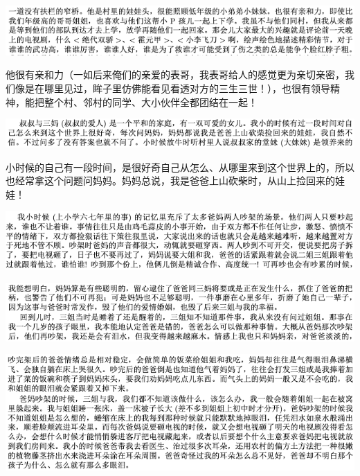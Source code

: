 \documentclass[9pt, b5paper]{article}
\begin{document}
\begin{center}
\includegraphics[width=.9\linewidth]{./pic/backups_plans_20210422_074655.png}
\end{center}

他很有亲和力（一如后来俺们的亲爱的表哥，我表哥给人的感觉更为亲切亲密，我们像是在哪里见过，眸子里仿佛能看见看透对方的三生三世！），也很有领导精神，能把整个村、邻村的同学、大小伙伴全都团结在一起！

\begin{center}
\includegraphics[width=.9\linewidth]{./pic/backups_plans_20210422_094617.png}
\end{center}

小时候的自己有一段时间，是很好奇自己从怎么、从哪里来到这个世界上的，所以也经常拿这个问题问妈妈。妈妈总说，我是爸爸上山砍柴时，从山上捡回来的娃娃！

\begin{center}
\includegraphics[width=.9\linewidth]{./pic/backups_plans_20210422_102924.png}
\end{center}

\begin{center}
\includegraphics[width=.9\linewidth]{./pic/backups_plans_20210422_103112.png}
\end{center}

\begin{center}
\includegraphics[width=.9\linewidth]{./pic/backups_plans_20210422_103008.png}
\end{center}
\end{document}
